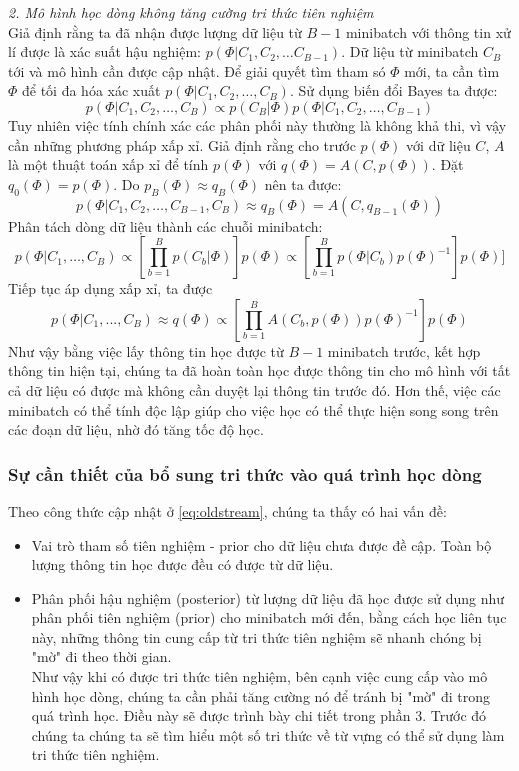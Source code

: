 \documentclass[fontsize=13pt]{scrartcl}
\begin{document}
\textit{2. Mô hình học dòng không tăng cường tri thức tiên nghiệm}\\
Giả định rằng ta đã nhận được lượng dữ liệu từ $B-1$ minibatch với thông tin xử lí được là xác suất hậu nghiệm: $p(\Phi | C_1,C_2,…C_{B-1} )$. Dữ liệu từ minibatch $C_B$ tới và mô hình cần được cập nhật.
Để giải quyết tìm tham só $\Phi$ mới, ta cần tìm $\Phi$ để tối đa hóa xác xuất $p(\Phi| C_1,C_2, …,C_B)$. Sử dụng biến đổi Bayes ta được:
\begin{equation}\label{eq:oldstream}
p(\Phi| C_1, C_2, \ldots,C_B) \propto p(C_B| \Phi)p(\Phi| C_1, C_2,\ldots, C_{B-1})
\end{equation}
Tuy nhiên việc tính chính xác các phân phối này thường là không khả thi, vì vậy cần những phương pháp xấp xỉ. 
Giả định rằng cho trước $p(\Phi)$ với dữ liệu $C$, $A$ là một thuật toán xấp xỉ để tính $p(\Phi)$ với $q(\Phi) = A(C,p(\Phi))$. Đặt $q_0(\Phi) = p(\Phi)$. Do $p_B(\Phi) \approx q_B(\Phi)$ nên ta được:
\begin{equation}
p(\Phi | C_1,C_2,\ldots,C_{B-1},C_B) \approx q_B(\Phi) = A(C,q_{B-1}(\Phi))
\end{equation}
Phân tách dòng dữ liệu thành các chuỗi minibatch:
\begin{equation}
p(\Phi | C_1,…,C_B ) \propto [ \prod_{b=1}^{B} p(C_b |  \Phi )]p(\Phi) \propto [\prod_{b=1}^{B} p(\Phi | C_b) p(\Phi)^{-1}]p(\Phi)]
\end{equation}
Tiếp tục áp dụng xấp xỉ, ta được
\begin{equation}\label{eq:oldstreamupdate}
p(\Phi |C_1,...,C_B) \approx q(\Phi) \propto [\prod_{b=1}^{B} A(C_b,p(\Phi)) p(\Phi)^{-1}]p(\Phi)
\end{equation}
Như vậy bằng việc lấy thông tin học được từ $B-1$ minibatch trước, kết hợp thông tin hiện tại, chúng ta đã hoàn toàn học được thông tin cho mô hình với tất cả dữ liệu có được mà không cần  duyệt lại thông tin trước đó. Hơn thế, việc các minibatch có thể tính độc lập giúp cho việc học có thể thực hiện song song trên các đoạn dữ liệu, nhờ đó tăng tốc độ học.
\subsubsection{Sự cần thiết của bổ sung tri thức vào quá trình học dòng}
Theo công thức cập nhật ở \ref{eq:oldstream}, chúng ta thấy có hai vấn đề:
\begin{itemize}
\item Vai trò tham số tiên nghiệm - prior cho dữ liệu chưa được đề cập. Toàn bộ lượng thông tin học được đều có được từ dữ liệu.
\item Phân phối hậu nghiệm (posterior) từ lượng dữ liệu đã học được sử dụng như phân phối tiên nghiệm (prior) cho minibatch mới đến, bằng cách học liên tục này, những thông tin cung cấp từ tri thức tiên nghiệm sẽ nhanh chóng bị "mờ" đi theo thời gian.\\
Như vậy khi có được tri thức tiên nghiệm, bên cạnh việc cung cấp vào mô hình học dòng, chúng ta cần phải tăng cường nó để tránh bị "mờ" đi trong quá trình học. Điều này sẽ được trình bày chi tiết trong phần 3. Trước đó chúng ta chúng ta sẽ tìm hiểu một số tri thức về từ vựng có thể sử dụng làm tri thức tiên nghiệm.
\end{itemize}
\end{document}
